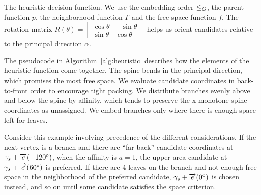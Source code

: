 \begin{algorithm}[p]

\caption[Heuristic decision function]{The heuristic decision function. We use the embedding order $\leq_G$, the parent function $p$, the neighborhood function $\Gamma$ and the free space function $f$. The rotation matrix $R(\theta) = \begin{bmatrix}\cos \theta & -\sin \theta \\ \sin \theta & \cos \theta \end{bmatrix}$ helps us orient candidates relative to the principal direction $\alpha$.}
\label{alg:heuristic}
\end{algorithm}

The pseudocode in Algorithm~\ref{alg:heuristic} describes how the elements of the heuristic function come together. The spine bends in the principal direction, which promises the most free space. We evaluate candidate coordinates in back-to-front order to encourage tight packing. We distribute branches evenly above and below the spine by affinity, which tends to preserve the x-monotone spine coordinates as unassigned. We embed branches only where there is enough space left for leaves.

Consider this example involving precedence of the different considerations. If the next vertex is a branch and there are ``far-back'' candidate coordinates at $\gamma_s + \overrightarrow e(-120^\circ)$, when the affinity is $a=1$, the upper area candidate at $\gamma_s + \overrightarrow e(60^\circ)$ is preferred. If there are 4 leaves on the branch and not enough free space in the neighborhood of the preferred candidate, $\gamma_s + \overrightarrow e(0^\circ)$ is chosen instead, and so on until some candidate satisfies the space criterion.

